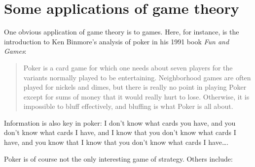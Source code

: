 \section{Some applications of game theory}

One obvious application of game theory is to games. Here, for instance, is the introduction to Ken Binmore's analysis of poker in his 1991 book \emph{Fun and Games}:

\begin{quote}
Poker is a card game for which one needs about seven players for the variants normally played to be entertaining. Neighborhood games are often played for nickels and dimes, but there is really no point in playing Poker except for sums of money that it would really hurt to lose. Otherwise, it is impossible to bluff effectively, and bluffing is what Poker is all about.
\end{quote}

\noindent Information is also key in poker: I don't know what cards you have, and you don't know what cards I have, and I know that you don't know what cards I have, and you know that I know that you don't know what cards I have\ldots.

Poker is of course not the only interesting game of strategy. Others include:

